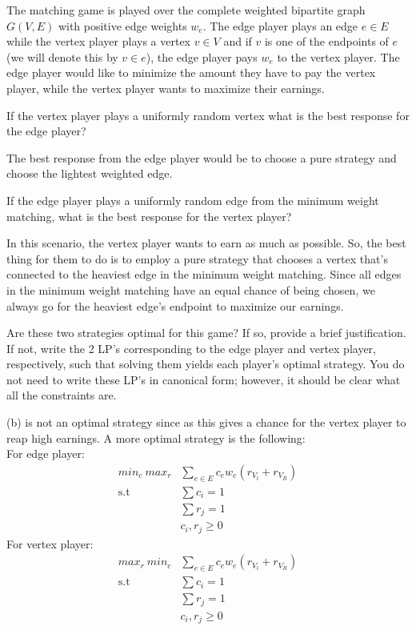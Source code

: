 \documentclass[11pt]{article}
\begin{document}
\newpage
{}
The matching game is played over the complete weighted bipartite graph $G(V, E)$ with positive edge weights $w_e$. The edge player plays an edge $e \in E$ while the vertex player plays a vertex $v \in V$ and if $v$ is one of the endpoints of $e$ (we will denote this by $v \in e$), the edge player pays $w_e$ to the vertex player. The edge player would like to minimize the amount they have to pay the vertex player, while the vertex player wants to maximize their earnings.
\begin{subparts}
\subpart If the vertex player plays a uniformly random vertex what is the best response for the edge player?\\
\begin{solution}
    The best response from the edge player would be to choose a pure strategy and choose the lightest weighted edge.
\end{solution}
\subpart If the edge player plays a uniformly random edge from the minimum weight matching, what is the best response for the vertex player?\\
\begin{solution}
    In this scenario, the vertex player wants to earn as much as possible. So, the best thing for them to do is to employ a pure strategy that chooses a vertex that's connected to the heaviest edge in the minimum weight matching. Since all edges in the minimum weight matching have an equal chance of being chosen, we always go for the heaviest edge's endpoint to maximize our earnings.
\end{solution}
\subpart Are these two strategies optimal for this game? If so, provide a brief justification. If not, write the 2 LP's corresponding to the edge player and vertex player, respectively, such that solving them yields each player's optimal strategy. You do not need to write these LP's in canonical form; however, it should be clear what all the constraints are.
\begin{solution}
    (b) is not an optimal strategy since as this gives a chance for the vertex player to reap high earnings. A more optimal strategy is the following:\\
    For edge player:
    \begin{align*}
        min_c ~ max_r &\sum_{e\in E} c_ew_e(r_{V_l} + r_{V_R})\\
        \text{s.t } &\sum c_i = 1\\
        &\sum r_j = 1\\
        & c_i, r_j \geq 0
    \end{align*}
    For vertex player:
    \begin{align*}
        max_r ~ min_c &\sum_{e\in E} c_ew_e(r_{V_l} + r_{V_R})\\
        \text{s.t } &\sum c_i = 1\\
        &\sum r_j = 1\\
        & c_i, r_j \geq 0
    \end{align*}
\end{solution}
\end{subparts}
\end{document}
